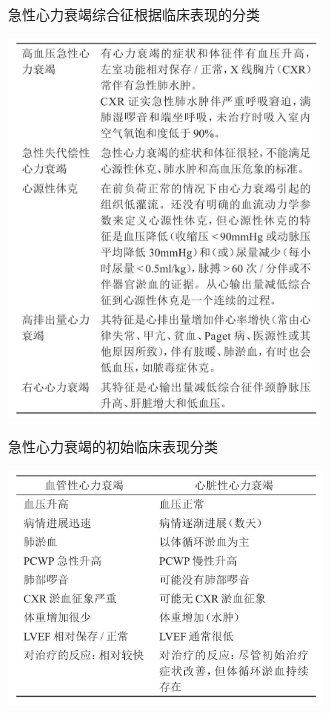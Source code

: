 \begin{table}[htbp]
\centering
\caption{急性心力衰竭综合征根据临床表现的分类}
\label{tab26-2}
\includegraphics[width=3.25in,height=3.95833in]{./images/Image00094.jpg}
\end{table}

\begin{table}[htbp]
\centering
\caption{急性心力衰竭的初始临床表现分类}
\label{tab26-3}
\includegraphics[width=3.27083in,height=2.4375in]{./images/Image00095.jpg}
\end{table}

